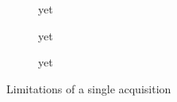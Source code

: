 \begin{figure}
\begin{subfigure}[t]{0.3\textwidth}
\begin{tikzpicture}
    
        \end{tikzpicture}

        \caption{yet}
    \end{subfigure}
    \begin{subfigure}[t]{0.3\textwidth}
        \centering

        \caption{yet}
    \end{subfigure}
    \begin{subfigure}[t]{0.3\textwidth}
        \centering

        \caption{yet}
    \end{subfigure}

    \caption{Limitations of a single acquisition}

\end{figure}



% 


